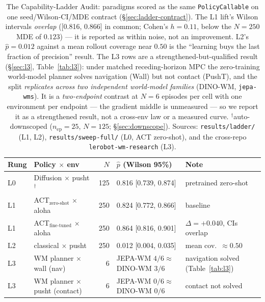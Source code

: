\documentclass[10pt]{article}
\begin{document}
\begin{table}[t]
\centering
\small
\begin{tabular}{llrll}
\toprule
Rung & Policy $\times$ env & $N$ & $\hat{p}$ (Wilson 95\%) & Note \\
\midrule
L0 & Diffusion $\times$ pusht$^\dagger$ & 125 & 0.816 [0.739, 0.874] & pretrained zero-shot \\
L1 & ACT$_\text{zero-shot}$ $\times$ aloha & 250 & 0.824 [0.772, 0.866] & baseline \\
L1 & ACT$_\text{fine-tuned}$ $\times$ aloha & 250 & 0.864 [0.816, 0.901] & $\Delta{=}{+}0.040$, CIs overlap \\
L2 & classical $\times$ pusht & 250 & 0.012 [0.004, 0.035] & mean cov.\ ${\approx}0.50$ \\
\midrule
L3 & WM planner $\times$ wall (nav) & 6 & JEPA-WM $4/6 \approx$ DINO-WM $3/6$ & navigation solved (Table~\ref{tab:l3}) \\
L3 & WM planner $\times$ pusht (contact) & 6 & JEPA-WM $0/6 \approx$ DINO-WM $0/6$ & contact not solved \\
\bottomrule
\end{tabular}
\caption{The Capability-Ladder Audit: paradigms scored as the same
\texttt{PolicyCallable} on one seed/Wilson-CI/MDE contract
(\S\ref{sec:ladder-contract}). The L1 lift's Wilson intervals
\emph{overlap} ([0.816, 0.866] in common; Cohen's $h{=}0.11$, below the
$N{=}250$ MDE of $0.123$) --- it is reported as within noise, not an
improvement. L2's $\hat{p}{=}0.012$ against a mean rollout coverage near
$0.50$ is the ``learning buys the last fraction of precision'' result.
The L3 rows are a strengthened-but-qualified result (\S\ref{sec:l3},
Table~\ref{tab:l3}): under matched receding-horizon MPC the zero-training
world-model planner solves navigation (Wall) but not contact (PushT), and
the split \emph{replicates across two independent world-model families}
(DINO-WM, \texttt{jepa-wms}). It is a \emph{two-endpoint} contrast at
$N{=}6$ episodes per cell with one environment per endpoint --- the
gradient middle is unmeasured --- so we report it as a strengthened result,
not a cross-env law or a measured curve.
$^\dagger$auto-downscoped ($n_\text{ep}{=}25$, $N{=}125$;
\S\ref{sec:downscope}). Sources: \texttt{results/ladder/} (L1, L2),
\texttt{results/sweep-full/} (L0, ACT zero-shot), and the cross-repo
\texttt{lerobot-wm-research} (L3).}
\label{tab:ladder}
\end{table}
\end{document}
